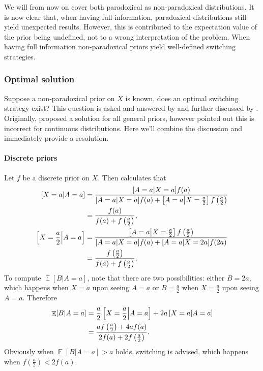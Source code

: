 \documentclass[twoside,a4paper]{article}
\theoremstyle{plain}
\theoremstyle{definition}
\theoremstyle{remark}
\numberwithin{equation}{section}
\let\P\relax
\DeclareMathOperator{\P}{\mathbb{P}}
\DeclareMathOperator{\E}{\mathbb{E}}
\DeclareMathOperator{\1}{\mathbbm{1}}
\begin{document}
We will from now on cover both paradoxical as non-paradoxical distributions. It is now clear that, when having full information, paradoxical distributions still yield unexpected results. However, this is contributed to the expectation value of the prior being undefined, not to a wrong interpretation of the problem. When having full information non-paradoxical priors yield well-defined switching strategies.

\subsubsection{Optimal solution}
Suppose a non-paradoxical prior on $X$ is known, does an optimal switching strategy exist? This question is asked and answered by \cite{Christensen92} and further discussed by \cite{Christensen93a,Christensen93b,Christensen94,Christensen96}. Originally, \cite{Christensen92} proposed a solution for all general priors, however \cite{Christensen96} pointed out this is incorrect for continuous distributions. Here we'll combine the discussion and immediately provide a resolution.

\paragraph{Discrete priors}
Let $f$ be a discrete prior on $X$. Then \cite{Christensen92} calculates that
\begin{align*}
\P\left[X=a\middle|A=a\right]&=\frac{\P[A=a|X=a]f(a)}{\P[A=a|X=a]f(a)+\P\left[A=a\middle|X=\frac{a}{2}\right]f\left(\frac{a}{2}\right)}\\
&=\frac{f(a)}{f(a)+f\left(\frac{a}{2}\right)},\\
\P\left[X=\frac{a}{2}\middle|A=a\right]&=\frac{\P\left[A=a\middle|X=\frac{a}{2}\right]f\left(\frac{a}{2}\right)}{\P[A=a|X=a]f(a)+\P[A=a|X=2a]f(2a)}\\
&=\frac{f\left(\frac{a}{2}\right)}{f(a)+f\left(\frac{a}{2}\right)},\\
\end{align*}
To compute $\E[B|A=a]$, note that there are two possibilities: either $B=2a$, which happens when $X=a$ upon seeing $A=a$ or $B=\frac{a}{2}$ when $X=\frac{a}{2}$ upon seeing $A=a$. Therefore
\begin{align*}
\E[B|A=a]&=\frac{a}{2}\P\left[X=\frac{a}{2}\middle|A=a\right]+2a\P\left[X=a\middle|A=a\right]\\
&=\frac{af\left(\frac{a}{2}\right)+4af(a)}{2f(a)+2f\left(\frac{a}{2}\right)}.
\end{align*}
Obviously when $\E[B|A=a]>a$ holds, switching is advised, which happens when $f\left(\frac{a}{2}\right)<2f(a)$.
\end{document}
